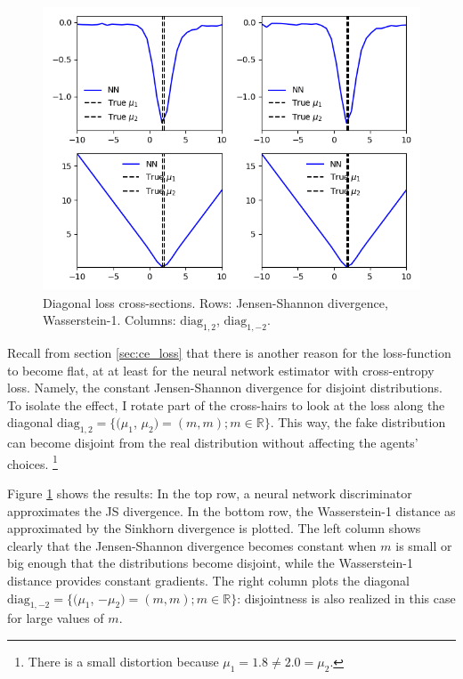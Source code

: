 \begin{figure}
    \includegraphics[width=\textwidth]{./Images/diagonal_loss_plots CE wasserstein-1.png} %
    \caption{Diagonal loss cross-sections. Rows: Jensen-Shannon divergence, Wasserstein-1. Columns: $\text{diag}_{1,2}$, $\text{diag}_{1,-2}$.}
    \label{fig:diagonal_loss_plots}
\end{figure}

Recall from section \ref{sec:ce_loss} that there is another reason for the loss-function to become flat,
at at least for the neural network estimator with cross-entropy loss.
Namely, the constant Jensen-Shannon divergence for disjoint distributions.
To isolate the effect, I rotate part of the cross-hairs to look at the loss along the diagonal $\text{diag}_{1,2} = \{(\mu_1$, $\mu_2) = (m, m); m \in \mathbb{R}\}$.
This way, the fake distribution can become disjoint from the real distribution without affecting the agents' choices.
\footnote{There is a small distortion because $\mu_1 = 1.8 \neq 2.0 = \mu_2$.}

Figure \ref{fig:diagonal_loss_plots} shows the results:
In the top row, a neural network discriminator approximates the JS divergence.
In the bottom row, the Wasserstein-1 distance as approximated by the Sinkhorn divergence is plotted.
The left column shows clearly that the Jensen-Shannon divergence becomes constant when $m$ is small or big enough that the distributions become disjoint, while the Wasserstein-1 distance provides constant gradients.
The right column plots the diagonal $\text{diag}_{1,-2} = \{(\mu_1$, $-\mu_2) = (m, m); m \in \mathbb{R}\}$: disjointness is also realized in this case for large values of $m$.

